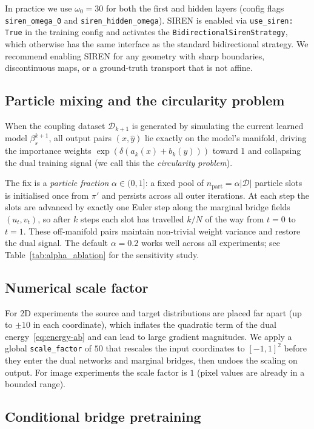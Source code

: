 \documentclass[11pt]{article}
\theoremstyle{definition}
\numberwithin{equation}{section}%
\begin{document}
In practice we use $\omega_0 = 30$ for both the first and hidden layers
(config flags \texttt{siren\_omega\_0} and \texttt{siren\_hidden\_omega}).
SIREN is enabled via \texttt{use\_siren: True} in the training config and
activates the \texttt{BidirectionalSirenStrategy}, which otherwise has
the same interface as the standard bidirectional strategy.
We recommend enabling SIREN for any geometry with sharp boundaries,
discontinuous maps, or a ground-truth transport that is not affine.

\subsection{Particle mixing and the circularity problem}

When the coupling dataset $\mathcal{D}_{k+1}$ is generated by simulating
the current learned model $\beta^{k+1}_s$, all output pairs $(x, \hat{y})$
lie exactly on the model's manifold, driving the importance weights
$\exp(\delta(a_k(x)+b_k(y)))$ toward 1 and collapsing the dual training
signal (we call this the \emph{circularity problem}).

The fix is a \emph{particle fraction} $\alpha \in (0,1]$: a fixed pool of
$n_\mathrm{part}\!=\!\alpha|\mathcal{D}|$ particle slots is initialised once from $\pi'$ and persists across all outer iterations.
At each step the slots are advanced by exactly one Euler step along the
marginal bridge fields $(u_t, v_t)$, so after $k$ steps each slot has
travelled $k/N$ of the way from $t=0$ to $t=1$.
These off-manifold pairs maintain non-trivial weight variance and restore
the dual signal. The default $\alpha = 0.2$ works well across all
experiments; see Table~\ref{tab:alpha_ablation} for the sensitivity study.
\subsection{Numerical scale factor}

For 2D experiments the source and target distributions are placed far apart
(up to $\pm 10$ in each coordinate), which inflates the quadratic term of
the dual energy~\eqref{eq:energy-ab} and can lead to large gradient
magnitudes. We apply a global \texttt{scale\_factor} of $50$ that rescales
the input coordinates to $[-1, 1]^2$ before they enter the dual networks
and marginal bridges, then undoes the scaling on output.
For image experiments the scale factor is $1$ (pixel values are already
in a bounded range).

\subsection{Conditional bridge pretraining}
\end{document}
